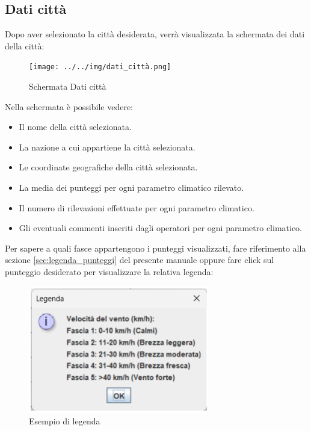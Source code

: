 \subsection{Dati città}
\label{sec:dati_città}
Dopo aver selezionato la città desiderata, verrà visualizzata la schermata dei dati della città:
\begin{figure}[H]
    \centering
    \texttt{[image: ../../img/dati\_città.png]}
    \caption{Schermata Dati città}
\end{figure}

Nella schermata è possibile vedere:
\begin{itemize}
    \item Il nome della città selezionata. 
    \item La nazione a cui appartiene la città selezionata.
    \item Le coordinate geografiche della città selezionata.
    \item La media dei punteggi per ogni parametro climatico rilevato.
    \item Il numero di rilevazioni effettuate per ogni parametro climatico.
    \item Gli eventuali commenti inseriti dagli operatori per ogni parametro climatico.
\end{itemize}

Per sapere a quali fasce appartengono i punteggi visualizzati, fare riferimento alla sezione \ref{sec:legenda_punteggi} del presente manuale oppure fare click sul punteggio
desiderato per visualizzare la relativa legenda:
\begin{figure}[H]
    \centering
    \includegraphics[width=0.7\textwidth]{../../img/esempio_legenda.png}
    \caption{Esempio di legenda}
\end{figure}

